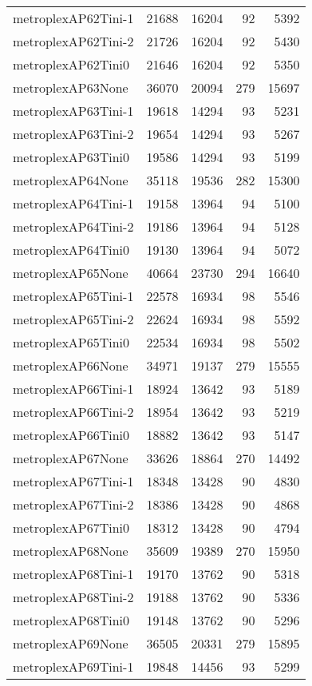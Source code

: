 \begin{longtable}{lrrrr}
metroplexAP62Tini-1 & 21688 & 16204 & 92 & 5392 \\
metroplexAP62Tini-2 & 21726 & 16204 & 92 & 5430 \\
metroplexAP62Tini0 & 21646 & 16204 & 92 & 5350 \\
metroplexAP63None & 36070 & 20094 & 279 & 15697 \\
metroplexAP63Tini-1 & 19618 & 14294 & 93 & 5231 \\
metroplexAP63Tini-2 & 19654 & 14294 & 93 & 5267 \\
metroplexAP63Tini0 & 19586 & 14294 & 93 & 5199 \\
metroplexAP64None & 35118 & 19536 & 282 & 15300 \\
metroplexAP64Tini-1 & 19158 & 13964 & 94 & 5100 \\
metroplexAP64Tini-2 & 19186 & 13964 & 94 & 5128 \\
metroplexAP64Tini0 & 19130 & 13964 & 94 & 5072 \\
metroplexAP65None & 40664 & 23730 & 294 & 16640 \\
metroplexAP65Tini-1 & 22578 & 16934 & 98 & 5546 \\
metroplexAP65Tini-2 & 22624 & 16934 & 98 & 5592 \\
metroplexAP65Tini0 & 22534 & 16934 & 98 & 5502 \\
metroplexAP66None & 34971 & 19137 & 279 & 15555 \\
metroplexAP66Tini-1 & 18924 & 13642 & 93 & 5189 \\
metroplexAP66Tini-2 & 18954 & 13642 & 93 & 5219 \\
metroplexAP66Tini0 & 18882 & 13642 & 93 & 5147 \\
metroplexAP67None & 33626 & 18864 & 270 & 14492 \\
metroplexAP67Tini-1 & 18348 & 13428 & 90 & 4830 \\
metroplexAP67Tini-2 & 18386 & 13428 & 90 & 4868 \\
metroplexAP67Tini0 & 18312 & 13428 & 90 & 4794 \\
metroplexAP68None & 35609 & 19389 & 270 & 15950 \\
metroplexAP68Tini-1 & 19170 & 13762 & 90 & 5318 \\
metroplexAP68Tini-2 & 19188 & 13762 & 90 & 5336 \\
metroplexAP68Tini0 & 19148 & 13762 & 90 & 5296 \\
metroplexAP69None & 36505 & 20331 & 279 & 15895 \\
metroplexAP69Tini-1 & 19848 & 14456 & 93 & 5299 \\

\end{longtable}

